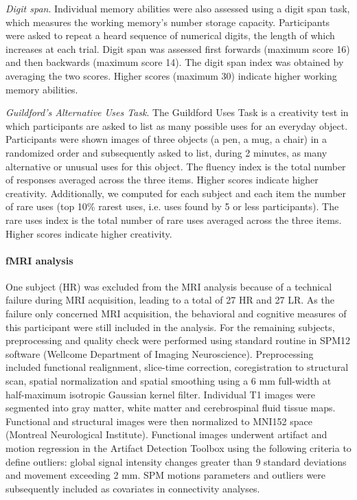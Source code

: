 \emph{Digit span}. Individual memory abilities were also assessed using a digit span task, which measures the working memory’s number storage capacity. Participants were asked to repeat a heard sequence of numerical digits, the length of which increases at each trial. Digit span was assessed first forwards (maximum score 16) and then backwards (maximum score 14). The digit span index was obtained by averaging the two scores. Higher scores (maximum 30) indicate higher working memory abilities.

\emph{Guildford’s Alternative Uses Task}. The Guildford Uses Task \citep{guildford_alternate_1978} is a creativity test in which participants are asked to list as many possible uses for an everyday object. Participants were shown images of three objects (a pen, a mug, a chair) in a randomized order and subsequently asked to list, during 2 minutes, as many alternative or unusual uses for this object. The fluency index is the total number of responses averaged across the three items. Higher scores indicate higher creativity. Additionally, we computed for each subject and each item the number of rare uses (top 10\% rarest uses, i.e. uses found by 5 or less participants). The rare uses index is the total number of rare uses averaged across the three items. Higher scores indicate higher creativity.

\paragraph{fMRI analysis}
One subject (HR) was excluded from the MRI analysis because of a technical failure during MRI acquisition, leading to a total of 27 HR and 27 LR. As the failure only concerned MRI acquisition, the behavioral and cognitive measures of this participant were still included in the analysis. For the remaining subjects, preprocessing and quality check were performed using standard routine in SPM12 software (Wellcome Department of Imaging Neuroscience). Preprocessing included functional realignment, slice-time correction, coregistration to structural scan, spatial normalization and spatial smoothing using a 6 mm full-width at half-maximum isotropic Gaussian kernel filter. Individual T1 images were segmented into gray matter, white matter and cerebrospinal fluid tissue maps. Functional and structural images were then normalized to MNI152 space (Montreal Neurological Institute). Functional images underwent artifact and motion regression in the Artifact Detection Toolbox using the following criteria to define outliers: global signal intensity changes greater than 9 standard deviations and movement exceeding 2 mm. SPM motions parameters and outliers were subsequently included as covariates in connectivity analyses.


